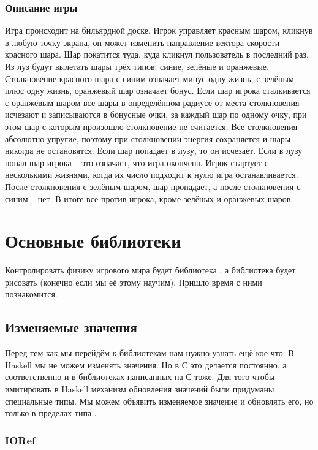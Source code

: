\subsubsection{Описание игры}

Игра происходит на бильярдной доске. Игрок управляет
красным шаром, кликнув в любую точку экрана, он может
изменить направление вектора скорости красного шара.
Шар покатится туда, куда кликнул пользователь в 
последний раз. Из луз будут вылетать шары трёх типов:
синие, зелёные и оранжевые. Столкновение красного
шара с синим означает минус одну жизнь, с зелёным --
плюс одну жизнь, оранжевый шар означает бонус.
Если шар игрока сталкивается с оранжевым шаром
все шары в определённом радиусе от места столкновения
исчезают и записываются в бонусные очки, за каждый шар по 
одному очку, при этом шар с которым произошло 
столкновение не считается. Все столкновения -- абсолютно упругие, 
поэтому при столкновении энергия сохраняется и шары
никогда не остановятся. Если шар попадает в лузу,
то он исчезает. Если в лузу попал шар игрока -- 
это означает, что игра окончена. Игрок стартует
с несколькими жизнями, когда их число подходит к нулю
игра останавливается. После столкновения с зелёным шаром,
шар пропадает, а после столкновения с синим -- нет. 
В итоге все против игрока, кроме зелёных и оранжевых шаров.


\section{Основные библиотеки}

Контролировать физику игрового мира будет библиотека
, а библиотека  будет рисовать 
(конечно если мы её этому научим). Пришло время с ними познакомится.

\subsection{Изменяемые значения}

Перед тем как мы перейдём к библиотекам нам
нужно узнать ещё кое-что. 
В Haskell мы не можем изменять значения. 
Но в С это делается постоянно, а соответственно и в библиотеках
написанных на С тоже. Для того чтобы имитировать в Haskell 
механизм обновления значений были придуманы специальные типы. 
Мы можем объявить изменяемое значение и обновлять
его, но только в пределах типа .

\subsubsection{IORef}

